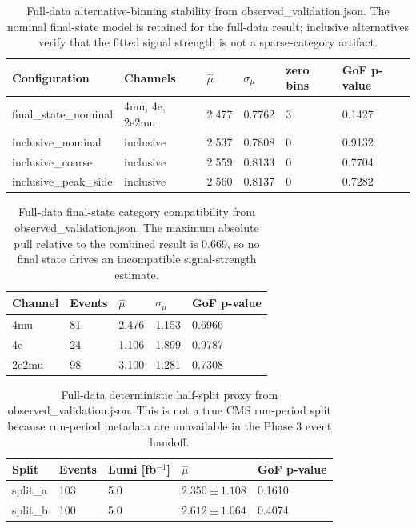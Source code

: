 \documentclass[11pt]{article}
\begin{document}
\begin{table}[htbp]
\centering
\caption{Full-data alternative-binning stability from observed\_validation.json. The nominal final-state model is retained for the full-data result; inclusive alternatives verify that the fitted signal strength is not a sparse-category artifact.}
\begin{tabular}{llllll}
\toprule
Configuration & Channels & $\hat{\mu}$ & $\sigma_\mu$ & zero bins & GoF p-value \\
\midrule
final\_state\_nominal & 4mu, 4e, 2e2mu & 2.477 & 0.7762 & 3 & 0.1427 \\
inclusive\_nominal & inclusive & 2.537 & 0.7808 & 0 & 0.9132 \\
inclusive\_coarse & inclusive & 2.559 & 0.8133 & 0 & 0.7704 \\
inclusive\_peak\_side & inclusive & 2.560 & 0.8137 & 0 & 0.7282 \\
\bottomrule
\end{tabular}
\label{tab:observed-binning}
\end{table}

\begin{table}[htbp]
\centering
\caption{Full-data final-state category compatibility from observed\_validation.json. The maximum absolute pull relative to the combined result is 0.669, so no final state drives an incompatible signal-strength estimate.}
\begin{tabular}{lllll}
\toprule
Channel & Events & $\hat{\mu}$ & $\sigma_\mu$ & GoF p-value \\
\midrule
4mu & 81 & 2.476 & 1.153 & 0.6966 \\
4e & 24 & 1.106 & 1.899 & 0.9787 \\
2e2mu & 98 & 3.100 & 1.281 & 0.7308 \\
\bottomrule
\end{tabular}
\label{tab:observed-category-compatibility}
\end{table}

\begin{table}[htbp]
\centering
\caption{Full-data deterministic half-split proxy from observed\_validation.json. This is not a true CMS run-period split because run-period metadata are unavailable in the Phase 3 event handoff.}
\begin{tabular}{lllll}
\toprule
Split & Events & Lumi [fb$^{-1}$] & $\hat{\mu}$ & GoF p-value \\
\midrule
split\_a & 103 & 5.0 & $2.350\pm1.108$ & 0.1610 \\
split\_b & 100 & 5.0 & $2.612\pm1.064$ & 0.4074 \\
\bottomrule
\end{tabular}
\label{tab:observed-split}
\end{table}
\end{document}
